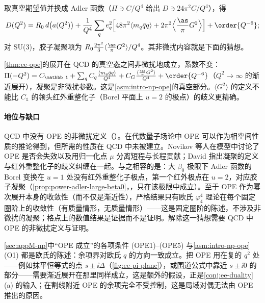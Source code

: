 取真空期望值并换成 Adler 函数（$\Pi\ni C/Q^4$ 给出 $D\ni24\pi^2C/Q^4$），得
\begin{equation}\label{eq:ee-adler-ope}
D(Q^2)=R_0\,d\big(a(Q^2)\big)+\frac{1}{Q^4}\sum_qe_q^2\Big[48\pi^2\langle m_q\bar qq\rangle+2\pi^2\Big\langle\frac{\as}\pi G^2\Big\rangle\Big]+\order{Q^{-6}} ;
\end{equation}
对 SU(3)，胶子凝聚项为 $R_0\frac{2\pi^2}3\langle\frac{\as}\pi G^2\rangle/Q^4$。其非微扰内容就是下面的猜想。

\begin{conjecture}\label{conj:ee-np-ope}
\cref{thm:ee-ope}的展开在 QCD 的真空态之间非微扰地成立，系数不变：$\Pi(-Q^2)=C_{\mathbb 1}+\sum_qC_q\frac{\langle m_q\bar qq\rangle}{Q^4}+C_G\frac{\langle\frac{\as}\pi G^2\rangle}{Q^4}+\order{Q^{-6}}$（$Q^2\to\infty$ 的渐近展开），凝聚是非微扰参数。这是\cref{asm:intro-np-ope}的真空部分。$\langle G^2\rangle$ 的定义不能比 $C_{\mathbb 1}$ 的领头红外重整化子（Borel 平面上 $u=2$ 的极点）的歧义更精确。
\end{conjecture}

\paragraph{地位与缺口}QCD 中没有 OPE 的非微扰定义（\tagC）。在代数量子场论中 OPE 可以作为相空间性质的推论得到\cite{Bostelmann:2005rr}，但所需的性质在 QCD 中未被建立。Novikov 等人在模型中讨论了 OPE 是否会失效以及用归一化点 $\mu$ 分离短程与长程贡献\cite{Novikov:1984rf}；David 指出凝聚的定义与红外重整化子的歧义纠缠在一起\cite{David:1983gz,David:1985xj}。与之相容的是：大 $\beta_0$ 极限下 Adler 函数的 Borel 变换在 $u=1$ 处没有红外重整化子极点，第一个红外极点在 $u=2$，对应胶子凝聚（\cref{prop:power-adler-large-beta0}，\tagP，只在该极限中成立）。至于 OPE 作为幂次展开本身的收敛性（而不仅是渐近性），严格结果只有欧氏 $\varphi^4_4$ 理论在每个固定圈阶上的收敛性（有质量情形\cite{Hollands:2011gf}，无质量情形\cite{Holland:2014pna}）——这是固定圈阶的陈述，不涉及非微扰的凝聚；格点上的数值结果是证据而不是证明。解除这一猜想需要 QCD 中 OPE 的非微扰定义与证明。

\begin{remark}\label{rem:ee-complex-ope}
\cref{sec:appM-np}中“OPE 成立”的各项条件 (OPE1)--(OPE5) 与\cref{asm:intro-np-ope}(O1) 都是欧氏的陈述：余项界对欧氏 $q$ 的方向一致成立。把 OPE 用在复的 $q^2$ 处——例如抹平恒等式的点 $s\pm\ii\Delta$（\cref{fig:ee-pi-plane}），或围道公式中靠近 $s\pm\ii0$ 的部分——需要渐近展开在那里同样成立，这是额外的假设，正是\cref{conj:ee-duality}(a) 的输入；在割线附近 OPE 的余项完全不受控制，这是局域对偶无法由 OPE 推出的原因。
\end{remark}

